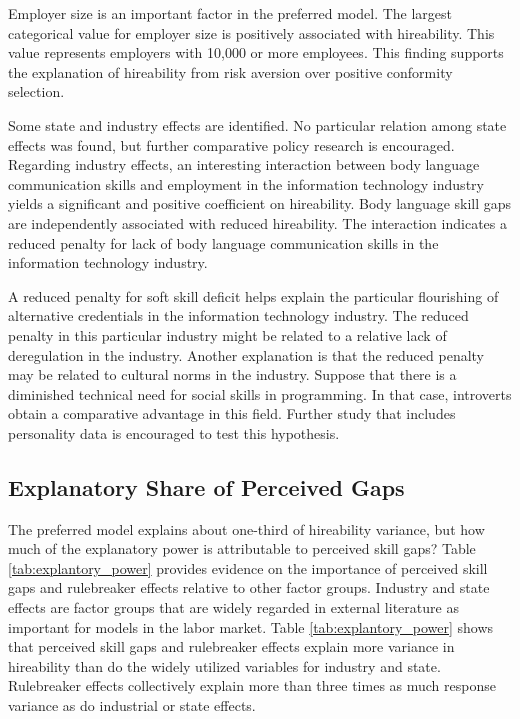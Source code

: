 \documentclass[review]{elsarticle}
\begin{document}
Employer size is an important factor in the preferred model.
The largest categorical value for employer size is positively associated with hireability.
This value represents employers with 10,000 or more employees.
This finding supports the explanation of hireability from risk aversion over positive conformity selection.

Some state and industry effects are identified.
No particular relation among state effects was found, but further comparative policy research is encouraged.
Regarding industry effects, an interesting interaction between body language communication skills and employment in the information technology industry yields a significant and positive coefficient on hireability.
Body language skill gaps are independently associated with reduced hireability.
The interaction indicates a reduced penalty for lack of body language communication skills
in the information technology industry.

A reduced penalty for soft skill deficit helps explain the particular flourishing of alternative credentials in the information technology industry.
The reduced penalty in this particular industry might be related to a relative lack of deregulation in the industry.
Another explanation is that the reduced penalty may be related to cultural norms in the industry.
Suppose that there is a diminished technical need for social skills in programming.
In that case, introverts obtain a comparative advantage in this field.
Further study that includes personality data is encouraged to test this hypothesis.

\subsection{Explanatory Share of Perceived Gaps}

The preferred model explains about one-third of hireability variance, but how much of the explanatory power is attributable to perceived skill gaps?
Table \ref{tab:explantory_power} provides evidence on the importance of perceived skill gaps and rulebreaker effects relative to other factor groups.
Industry and state effects are factor groups that are widely regarded in external literature as important for models in the labor market.
Table \ref{tab:explantory_power} shows that perceived skill gaps and rulebreaker effects explain more variance in hireability than do the widely utilized variables for industry and state.
Rulebreaker effects collectively explain more than three times as much response variance as do industrial or state effects.
\end{document}
